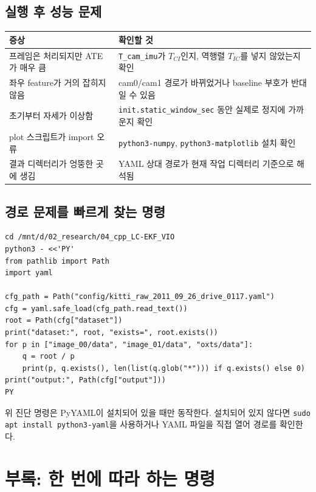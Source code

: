 \documentclass[11pt,a4paper,oneside]{report}
\begin{document}
\section{실행 후 성능 문제}

\begin{longtable}{p{}p{}}
\toprule
증상 & 확인할 것 \\
\midrule
프레임은 처리되지만 ATE가 매우 큼 & \texttt{T\_cam\_imu}가 \(T_{CI}\)인지, 역행렬 \(T_{IC}\)를 넣지 않았는지 확인 \\
좌우 feature가 거의 잡히지 않음 & cam0/cam1 경로가 바뀌었거나 baseline 부호가 반대일 수 있음 \\
초기부터 자세가 이상함 & \texttt{init.static\_window\_sec} 동안 실제로 정지에 가까운지 확인 \\
plot 스크립트가 import 오류 & \texttt{python3-numpy}, \texttt{python3-matplotlib} 설치 확인 \\
결과 디렉터리가 엉뚱한 곳에 생김 & YAML 상대 경로가 현재 작업 디렉터리 기준으로 해석됨 \\
\bottomrule
\end{longtable}

\section{경로 문제를 빠르게 찾는 명령}

\begin{lstlisting}[style=shell,caption={YAML 경로 대상 존재 여부 확인}]
cd /mnt/d/02_research/04_cpp_LC-EKF_VIO
python3 - <<'PY'
from pathlib import Path
import yaml

cfg_path = Path("config/kitti_raw_2011_09_26_drive_0117.yaml")
cfg = yaml.safe_load(cfg_path.read_text())
root = Path(cfg["dataset"])
print("dataset:", root, "exists=", root.exists())
for p in ["image_00/data", "image_01/data", "oxts/data"]:
    q = root / p
    print(p, q.exists(), len(list(q.glob("*"))) if q.exists() else 0)
print("output:", Path(cfg["output"]))
PY
\end{lstlisting}

\begin{warnbox}
위 진단 명령은 PyYAML이 설치되어 있을 때만 동작한다. 설치되어 있지 않다면
\texttt{sudo apt install python3-yaml}을 사용하거나 YAML 파일을 직접 열어 경로를 확인한다.
\end{warnbox}

\chapter{부록: 한 번에 따라 하는 명령}
\end{document}
